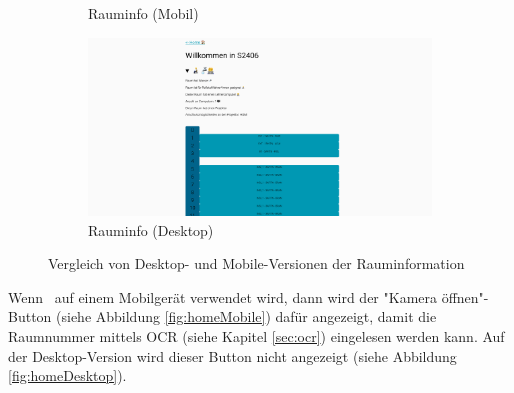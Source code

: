 \begin{figure}[H]
\begin{subfigure}[b]{0.34\textwidth}
        \caption{Rauminfo (Mobil)}
    \end{subfigure} \hfill
    \begin{subfigure}[b]{0.64\textwidth}
        \centering
        \includegraphics[width=\textwidth]{media/ResponsiveDesign/ZeliaDesktop.png}
        \caption{Rauminfo (Desktop)}
    \end{subfigure} 
    \caption{Vergleich von Desktop- und Mobile-Versionen der Rauminformation}
    \label{fig:info}
\end{figure}


Wenn \ZELIA\ auf einem Mobilgerät verwendet wird, dann wird der "Kamera öffnen"-Button (siehe Abbildung \ref{fig:homeMobile}) dafür angezeigt, damit die Raumnummer mittels OCR (siehe Kapitel \ref{sec:ocr}) eingelesen werden kann. Auf der Desktop-Version wird dieser Button nicht angezeigt (siehe Abbildung \ref{fig:homeDesktop}).

